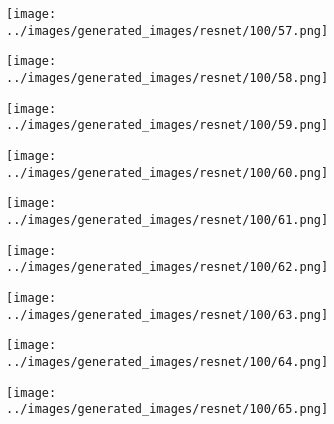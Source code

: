\begin{figure}[H]
\begin{subfigure}[b]{0.1\textwidth}
\end{subfigure}
\hspace{1em}%
\begin{subfigure}[b]{0.1\textwidth}
\centering
\texttt{[image: ../images/generated\_images/resnet/100/57.png]}
\end{subfigure}
\hspace{1em}%
\begin{subfigure}[b]{0.1\textwidth}
\centering
\texttt{[image: ../images/generated\_images/resnet/100/58.png]}
\end{subfigure}
\hspace{1em}%
\begin{subfigure}[b]{0.1\textwidth}
\centering
\texttt{[image: ../images/generated\_images/resnet/100/59.png]}
\end{subfigure}
\hspace{1em}%
\begin{subfigure}[b]{0.1\textwidth}
\centering
\texttt{[image: ../images/generated\_images/resnet/100/60.png]}
\end{subfigure}
\hspace{1em}%
\begin{subfigure}[b]{0.1\textwidth}
\centering
\texttt{[image: ../images/generated\_images/resnet/100/61.png]}
\end{subfigure}
\hspace{1em}%
\begin{subfigure}[b]{0.1\textwidth}
\centering
\texttt{[image: ../images/generated\_images/resnet/100/62.png]}
\end{subfigure}
\hspace{1em}%
\begin{subfigure}[b]{0.1\textwidth}
\centering
\texttt{[image: ../images/generated\_images/resnet/100/63.png]}
\end{subfigure}
\hspace{1em}%
\begin{subfigure}[b]{0.1\textwidth}
\centering
\texttt{[image: ../images/generated\_images/resnet/100/64.png]}
\end{subfigure}
\hspace{1em}%
\begin{subfigure}[b]{0.1\textwidth}
\centering
\texttt{[image: ../images/generated\_images/resnet/100/65.png]}
\end{subfigure}
\hspace{1em}%

\end{figure}
